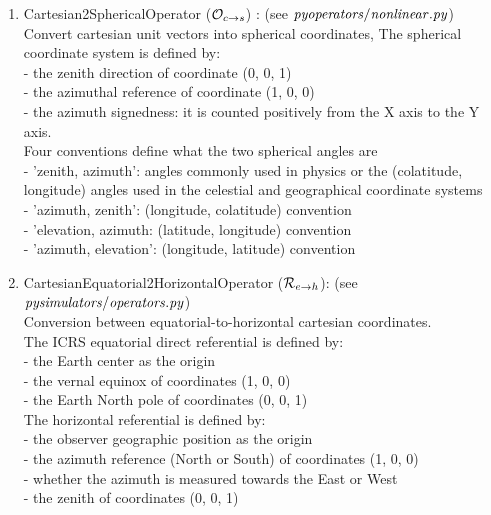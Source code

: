 \documentclass[a4paper, 11pt]{article}
\begin{document}
 \begin{enumerate}
\item Cartesian2SphericalOperator (${\cal O}_{c \rightarrow s} $)  :  (see $\it{pyoperators/nonlinear.py }$) \\ Convert cartesian unit vectors into spherical coordinates, The spherical coordinate system is defined by: \\
  - the zenith direction of coordinate (0, 0, 1) \\
  - the azimuthal reference of coordinate (1, 0, 0) \\
 - the azimuth signedness: it is counted positively from the X axis  to the Y axis. \\
 Four conventions define what the two spherical angles are \\
- 'zenith, azimuth':  angles commonly used in physics or the (colatitude, longitude) angles used in the celestial and geographical coordinate systems \\
- 'azimuth, zenith': (longitude, colatitude) convention \\
- 'elevation, azimuth: (latitude, longitude) convention \\
 - 'azimuth, elevation': (longitude, latitude) convention  
\item CartesianEquatorial2HorizontalOperator (${\cal R}_{e \rightarrow h} $): (see $\it{pysimulators/operators.py}$)  \\   Conversion between equatorial-to-horizontal cartesian coordinates. \\
The ICRS equatorial direct referential is defined by: \\
 - the Earth center as the origin \\
 - the vernal equinox of coordinates (1, 0, 0) \\
- the Earth North pole of coordinates (0, 0, 1) \\
 The horizontal referential is defined by: \\
 - the observer geographic position as the origin \\
 - the azimuth reference (North or South) of coordinates (1, 0, 0) \\
 - whether the azimuth is measured towards the East or West \\
 - the zenith of coordinates (0, 0, 1)


\end{enumerate}
\end{document}

